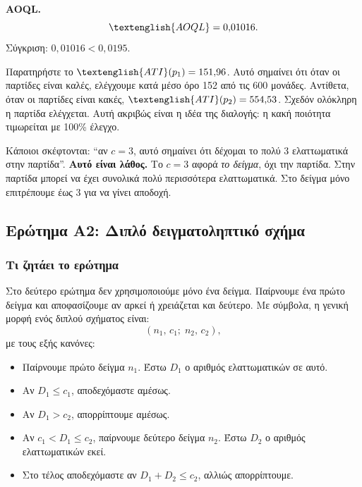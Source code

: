 \documentclass[12pt,a4paper]{article}
\newcommand{\AOQL}{\textenglish{AOQL}}
\newcommand{\ATI}{\textenglish{ATI}}
\begin{document}
\textbf{AOQL.}
\[
    \AOQL=0{,}01016.
\]
Σύγκριση: \(0{,}01016 < 0{,}0195\). \checkmark

\begin{intuition}
Παρατηρήστε το \(\ATI(p_1)=151{,}96\). Αυτό σημαίνει ότι όταν οι παρτίδες
είναι καλές, ελέγχουμε κατά μέσο όρο 152 από τις 600 μονάδες. Αντίθετα,
όταν οι παρτίδες είναι κακές, \(\ATI(p_2)=554{,}53\). Σχεδόν ολόκληρη η
παρτίδα ελέγχεται. Αυτή ακριβώς είναι η ιδέα της διαλογής: η κακή ποιότητα
τιμωρείται με 100\% έλεγχο.
\end{intuition}

\begin{trap}
Κάποιοι σκέφτονται: ``αν \(c=3\), αυτό σημαίνει ότι δέχομαι το πολύ 3
ελαττωματικά στην παρτίδα''. \textbf{Αυτό είναι λάθος.} Το \(c=3\) αφορά
\emph{το δείγμα}, όχι την παρτίδα. Στην παρτίδα μπορεί να έχει συνολικά
πολύ περισσότερα ελαττωματικά. Στο δείγμα μόνο επιτρέπουμε έως 3 για να
γίνει αποδοχή.
\end{trap}

\subsection{Ερώτημα Α2: Διπλό δειγματοληπτικό σχήμα}

\subsubsection*{Τι ζητάει το ερώτημα}

Στο δεύτερο ερώτημα δεν χρησιμοποιούμε μόνο ένα δείγμα. Παίρνουμε ένα πρώτο
δείγμα και αποφασίζουμε αν αρκεί ή χρειάζεται και δεύτερο. Με σύμβολα, η
γενική μορφή ενός διπλού σχήματος είναι:
\[
    (n_1,\,c_1;\;n_2,\,c_2),
\]
με τους εξής κανόνες:

\begin{itemize}[leftmargin=2.2em]
    \item Παίρνουμε πρώτο δείγμα \(n_1\). Έστω \(D_1\) ο αριθμός ελαττωματικών
    σε αυτό.
    \item Αν \(D_1\le c_1\), αποδεχόμαστε αμέσως.
    \item Αν \(D_1 > c_2\), απορρίπτουμε αμέσως.
    \item Αν \(c_1<D_1\le c_2\), παίρνουμε δεύτερο δείγμα \(n_2\). Έστω
    \(D_2\) ο αριθμός ελαττωματικών εκεί.
    \item Στο τέλος αποδεχόμαστε αν \(D_1+D_2\le c_2\), αλλιώς απορρίπτουμε.
\end{itemize}
\end{document}
